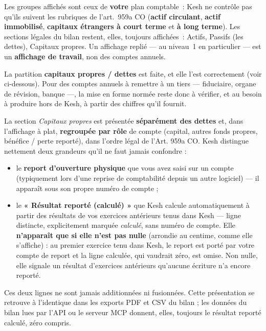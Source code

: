 \documentclass[a4paper,11pt,oneside]{article}
\begin{document}
\begin{keshwarning}[title=\faExclamationTriangle\ Le bilan n'est pas encore structuré selon l'art.~959a CO]
Les groupes affichés sont ceux de \textbf{votre} plan comptable~: Kesh ne contrôle pas qu'ils
suivent les rubriques de l'art.~959a CO (\textbf{actif circulant}, \textbf{actif immobilisé},
\textbf{capitaux étrangers à court terme} et \textbf{à long terme}). Les sections légales du
bilan restent, elles, toujours affichées~: Actifs, Passifs (les dettes), Capitaux propres. Un
affichage replié --- au niveau~1 en particulier --- est un \textbf{affichage de travail}, non
des comptes annuels.

\medskip
\noindent La partition \textbf{capitaux propres / dettes} est faite, et elle l'est
correctement (voir ci-dessous). Pour des comptes annuels à remettre à un tiers --- fiduciaire,
organe de révision, banque ---, la mise en forme normée reste donc à vérifier, et au besoin à
produire hors de Kesh, à partir des chiffres qu'il fournit.
\end{keshwarning}

La section \emph{Capitaux propres} est présentée \textbf{séparément des dettes} et, dans
l'affichage à plat, \textbf{regroupée par rôle} de compte (capital, autres fonds propres, bénéfice / perte reporté), dans l'ordre légal de l'Art. 959a CO. Kesh distingue nettement deux grandeurs qu'il ne faut jamais confondre :

\begin{itemize}
    \item le \textbf{report d'ouverture physique} que vous avez saisi sur un compte (typiquement lors d'une reprise de comptabilité depuis un autre logiciel) — il apparaît sous son propre numéro de compte ;
    \item le \textbf{« Résultat reporté (calculé) »} que Kesh calcule automatiquement à partir des résultats de vos exercices antérieurs tenus dans Kesh — ligne distincte, explicitement marquée \emph{calculé}, sans numéro de compte. Elle \textbf{n'apparaît que si elle n'est pas nulle} (arrondie au centime, comme elle s'affiche) : au premier exercice tenu dans Kesh, le report est porté par votre compte de report et la ligne calculée, qui vaudrait zéro, est omise. Non nulle, elle signale un résultat d'exercices antérieurs qu'aucune écriture n'a encore reporté.
\end{itemize}

Ces deux lignes ne sont jamais additionnées ni fusionnées. Cette présentation se retrouve à l'identique dans les exports PDF et CSV du bilan ; les données du bilan lues par l'API ou le serveur MCP donnent, elles, toujours le résultat reporté calculé, zéro compris.
\end{document}
